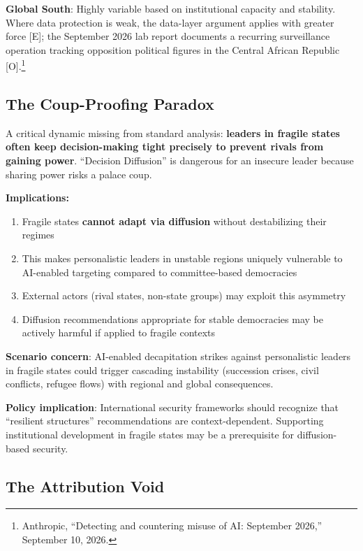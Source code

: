 \documentclass[11pt,letterpaper]{article}
\begin{document}
\textbf{Global South}: Highly variable based on institutional capacity and stability. Where data protection is weak, the data-layer argument applies with greater force [E]; the September 2026 lab report documents a recurring surveillance operation tracking opposition political figures in the Central African Republic [O].\footnote{Anthropic, ``Detecting and countering misuse of AI: September 2026,'' September 10, 2026.}

\subsection{The Coup-Proofing Paradox}

A critical dynamic missing from standard analysis: \textbf{leaders in fragile states often keep decision-making tight precisely to prevent rivals from gaining power}. ``Decision Diffusion'' is dangerous for an insecure leader because sharing power risks a palace coup.

\textbf{Implications:}
\begin{enumerate}
  \item Fragile states \textbf{cannot adapt via diffusion} without destabilizing their regimes
  \item This makes personalistic leaders in unstable regions uniquely vulnerable to AI-enabled targeting compared to committee-based democracies
  \item External actors (rival states, non-state groups) may exploit this asymmetry
  \item Diffusion recommendations appropriate for stable democracies may be actively harmful if applied to fragile contexts
\end{enumerate}

\textbf{Scenario concern}: AI-enabled decapitation strikes against personalistic leaders in fragile states could trigger cascading instability (succession crises, civil conflicts, refugee flows) with regional and global consequences.

\textbf{Policy implication}: International security frameworks should recognize that ``resilient structures'' recommendations are context-dependent. Supporting institutional development in fragile states may be a prerequisite for diffusion-based security.

\subsection{The Attribution Void}
\end{document}
